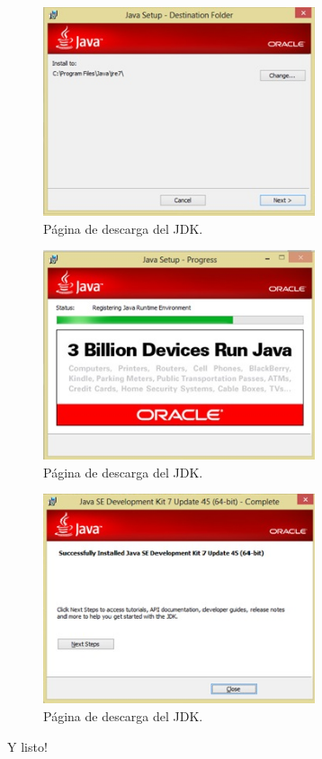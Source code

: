 \documentclass[12pt]{book} %
\begin{document}
\begin{enumerate}
\begin{figure}[!hbp]
	\end{figure}
	\begin{figure}[!hbp]
		\centering
			\includegraphics[width=8cm]{ins6.jpg}
			\caption{Página de descarga del JDK.}
		
	\end{figure}
	\begin{figure}[!hbp]
		\centering
			\includegraphics[width=8cm]{ins7.jpg}
			\caption{Página de descarga del JDK.}
		
	\end{figure}
	\begin{figure}[!hbp]
		\centering
			\includegraphics[width=8cm]{ins8.jpg}
			\caption{Página de descarga del JDK.}
		
	\end{figure}
	
Y listo!

\end{enumerate}
\end{document}
